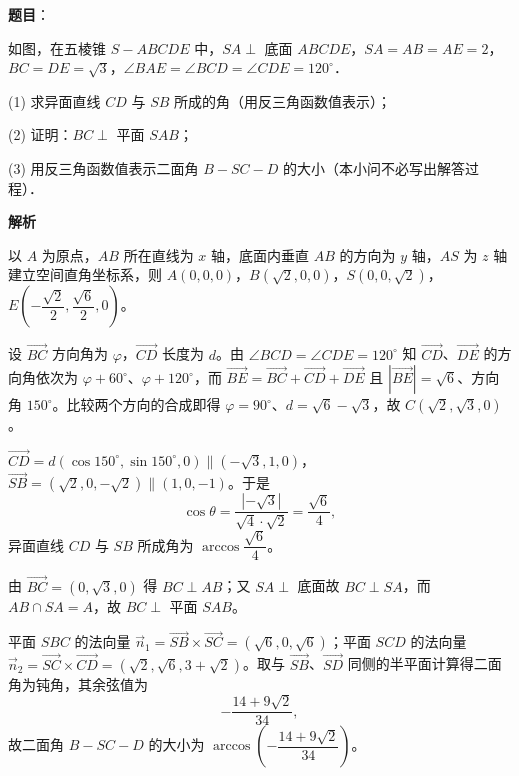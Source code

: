 \begin{answer}

\textbf{题目}：

如图，在五棱锥 $S - ABCDE$ 中，$SA \perp$ 底面 $ABCDE$，$SA = AB = AE = 2$，$BC = DE = \sqrt{3}$，$\angle BAE = \angle BCD = \angle CDE = 120^\circ$．

(1) 求异面直线 $CD$ 与 $SB$ 所成的角（用反三角函数值表示）；

(2) 证明：$BC \perp$ 平面 $SAB$；

(3) 用反三角函数值表示二面角 $B - SC - D$ 的大小（本小问不必写出解答过程）．
\nopagebreak[4]
\begin{center}\end{center}
\nopagebreak[4]
\textbf{解析}

以 $A$ 为原点，$AB$ 所在直线为 $x$ 轴，底面内垂直 $AB$ 的方向为 $y$ 轴，$AS$ 为 $z$ 轴建立空间直角坐标系，则 $A(0,0,0)$，$B(\sqrt{2}, 0, 0)$，$S(0, 0, \sqrt{2})$，$E\left(-\dfrac{\sqrt{2}}{2}, \dfrac{\sqrt{6}}{2}, 0\right)$。

设 $\vec{BC}$ 方向角为 $\varphi$，$\vec{CD}$ 长度为 $d$。由 $\angle BCD = \angle CDE = 120^\circ$ 知 $\vec{CD}$、$\vec{DE}$ 的方向角依次为 $\varphi + 60^\circ$、$\varphi + 120^\circ$，而 $\vec{BE} = \vec{BC} + \vec{CD} + \vec{DE}$ 且 $\left|\vec{BE}\right| = \sqrt{6}$、方向角 $150^\circ$。比较两个方向的合成即得 $\varphi = 90^\circ$、$d = \sqrt{6} - \sqrt{3}$，故 $C(\sqrt{2}, \sqrt{3}, 0)$。


$\vec{CD} = d\left(\cos 150^\circ, \sin 150^\circ, 0\right) \parallel \left(-\sqrt{3}, 1, 0\right)$，$\vec{SB} = \left(\sqrt{2}, 0, -\sqrt{2}\right) \parallel \left(1, 0, -1\right)$。于是
\nopagebreak[4]
\[
\cos\theta = \frac{\left|-\sqrt{3}\right|}{\sqrt{4}\cdot\sqrt{2}} = \frac{\sqrt{6}}{4},
\]
异面直线 $CD$ 与 $SB$ 所成角为 $\arccos\dfrac{\sqrt{6}}{4}$。


由 $\vec{BC} = (0, \sqrt{3}, 0)$ 得 $BC \perp AB$；又 $SA \perp$ 底面故 $BC \perp SA$，而 $AB \cap SA = A$，故 $BC \perp$ 平面 $SAB$。


平面 $SBC$ 的法向量 $\vec{n}_1 = \vec{SB}\times\vec{SC} = \left(\sqrt{6}, 0, \sqrt{6}\right)$；平面 $SCD$ 的法向量 $\vec{n}_2 = \vec{SC}\times\vec{CD} = \left(\sqrt{2}, \sqrt{6}, 3 + \sqrt{2}\right)$。取与 $\vec{SB}$、$\vec{SD}$ 同侧的半平面计算得二面角为钝角，其余弦值为
\nopagebreak[4]
\[
-\frac{14 + 9\sqrt{2}}{34},
\]
故二面角 $B - SC - D$ 的大小为 $\arccos\left(-\dfrac{14 + 9\sqrt{2}}{34}\right)$。




\end{answer}
